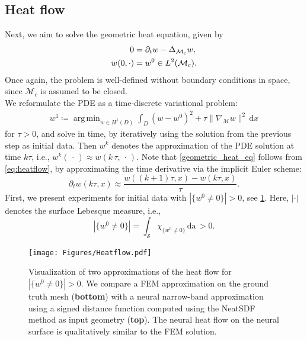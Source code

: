 \documentclass[12pt,openany]{book}
\theoremstyle{plainnormal}
\theoremstyle{remark}
\DeclareMathOperator*{\argmin}{arg\,min}
\begin{document}
\subsection{Heat flow}\label{section_heatflow}
Next, we aim to solve the geometric heat equation, given by
\begin{align}\label{eq:heatflow}
    0 &= \partial_t w - \Delta_{\mathcal{M}_c} w,\notag \\
    w(0,\cdot) &= w^0 \in L^2(\mathcal{M}_c).  
\end{align}
Once again, the problem is well-defined without boundary conditions in space, since $\mathcal{M}_c$ is assumed to be closed.\\
We reformulate the PDE as a time-discrete variational problem:
\begin{align}\label{geometric_heat_eq}
    w^{1} \coloneqq \argmin_{w\in H^1(D)}\int_D (w - w^0)^2 + \tau \|\nabla_{\mathcal{M}}w\|^2 \,\mathrm{d}x
\end{align} for $\tau > 0 $, and solve in time, by iteratively using the solution from the previous step as initial data. Then $w^k$ denotes the approximation of the PDE solution at time $k\tau$, i.e., $w^k(\,\cdot\,) \approx w(k\,\tau, \,\cdot\,)$. Note that \cref{geometric_heat_eq} follows from \cref{eq:heatflow}, by approximating the time derivative via the implicit Euler scheme:  $$\partial_t w(k\tau, x) \approx \frac{w((k+1)\tau, x) - w(k\tau, x)}{\tau}. $$
First, we present experiments for initial data with $|\{w^0 \neq0\}| >0$, see \cref{comp_beethoven}. Here, $|\cdot|$ denotes the surface Lebesque measure, i.e., $$|\{w^0 \neq0\}| = \int_\mathcal{S} \chi_{\{w^0 \neq 0\}} \,\mathrm{da}\, {>} 0.$$
\begin{figure}
    \centering    
    \texttt{[image: Figures/Heatflow.pdf]}
\caption{Visualization of two approximations of the heat flow for $|\{w^0 \neq0\}| >0$. We compare a FEM approximation on the ground truth mesh (\textbf{bottom}) with a neural narrow-band approximation using a signed distance function computed using the NeatSDF method as input geometry (\textbf{top}). The neural heat flow on the neural surface is qualitatively similar to the FEM solution.}\label{comp_beethoven}
\end{figure}
\end{document}
